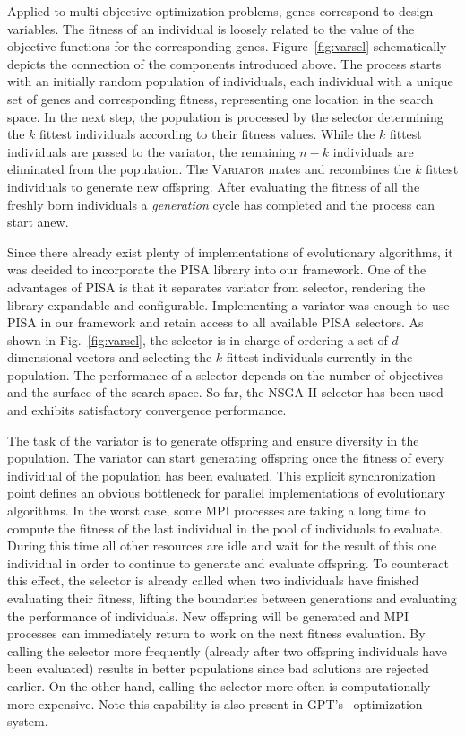 \documentclass[preprint,linenumbers,amsmath,amssymb,aps,prstab]{revtex4-1}%
\begin{document}
Applied to multi-objective optimization problems, genes correspond to
  design variables.
The fitness of an individual is loosely related to the value of the objective
  functions for the corresponding genes.
Figure~\ref{fig:varsel} schematically depicts the connection of the
  components introduced above.
The process starts with an initially random population of individuals, each
  individual with a unique set of genes and corresponding fitness,
  representing one location in the search space.
In the next step, the population is processed by the selector
  determining the $k$ fittest individuals according to their fitness values.
While the $k$ fittest individuals are passed to the variator, the
  remaining $n-k$ individuals are eliminated from the population.
The \textsc{Variator} mates and recombines the $k$ fittest individuals to
  generate new offspring.
After evaluating the fitness of all the freshly born individuals a
  \textit{generation} cycle has completed and the process can start anew.

Since there already exist plenty of implementations of evolutionary algorithms,
  it was decided to incorporate the PISA library \cite{pisa} into our
  framework.
One of the advantages of PISA is that it separates variator from selector,
  rendering the library expandable and configurable.
Implementing a variator was enough to use PISA in our framework and
  retain access to all available PISA selectors.
As shown in Fig.~\ref{fig:varsel}, the selector is in charge of ordering a
  set of $d$-dimensional vectors and selecting the $k$ fittest individuals
  currently in the population.
The performance of a selector depends on the number of objectives and the
  surface of the search space.
So far, the NSGA-II selector \cite{dpam:02} has been used and exhibits satisfactory
  convergence performance.

The task of the variator is to generate offspring and ensure diversity in the
  population.
The variator can start generating offspring once the fitness of every
  individual of the population has been evaluated.
This explicit synchronization point defines an obvious bottleneck for parallel
  implementations of evolutionary algorithms.
In the worst case, some MPI processes are taking a long time to compute the
  fitness of the last individual in the pool of individuals to evaluate.
During this time all other resources are idle and wait for the result of
  this one individual in order to continue to generate and evaluate offspring.
To counteract this effect, the selector is already called when two individuals
  have finished evaluating their fitness, lifting the boundaries between
  generations and evaluating the performance of individuals.
New offspring will be generated and MPI processes can immediately return to
  work on the next fitness evaluation.
By calling the selector more frequently (already after two offspring
  individuals have been evaluated) results in better populations since bad
  solutions are rejected earlier.
On the other hand, calling the selector more often is computationally more
  expensive. Note this capability is also present in GPT's~\cite{gpt} optimization system. 
\end{document}

